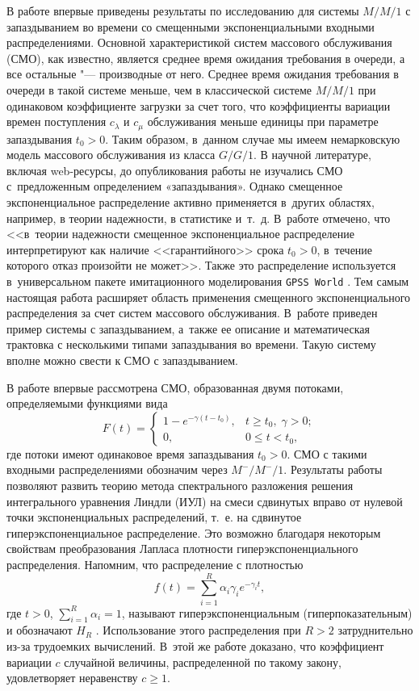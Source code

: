 В работе  \cite{tar:tarasov_1} впервые приведены результаты по исследованию для системы $M/M/1$ с запаздыванием во времени со смещенными экспоненциальными входными распределениями.
Основной характеристикой систем массового обслуживания (СМО), как известно, является среднее время ожидания требования в очереди, а все остальные "--- производные от него. Среднее время ожидания требования в очереди в такой системе меньше, чем в классической системе $M/M/1$ при одинаковом коэффициенте загрузки за счет того, что коэффициенты вариации времен поступления $c_{\lambda}$ и $c_{\mu}$ обслуживания меньше единицы при параметре запаздывания $t_0>0$. Таким образом, в~данном случае мы имеем немарковскую модель массового обслуживания из класса $G/G/1$. В научной литературе, включая web-ресурсы, до опубликования работы \cite{tar:tarasov_1} не изучались СМО с~предложенным определением «запаздывания». Однако смещенное экспоненциальное распределение активно применяется в~других областях, например, в теории надежности, в статистике и~т.~д. В~работе \cite{tar:kos} отмечено, что <<в~теории надежности смещенное экспоненциальное распределение интерпретируют как наличие <<гарантийного>> срока $t_0>0$, в~течение которого отказ произойти не может>>. Также это распределение используется в~универсальном пакете имитационного моделирования {\tt GPSS World} \cite{tar:boev}. 
Тем самым  настоящая работа расширяет область применения смещенного экспоненциального распределения за счет систем массового обслуживания. 
В~работе \cite{tar:med} приведен пример системы с запаздыванием, а~также ее описание и математическая трактовка с несколькими типами запаздывания во времени. Такую систему вполне можно свести к СМО с запаздыванием.

В работе \cite{tar:tarasov_1} впервые рассмотрена СМО, образованная двумя потоками, определяемыми функциями вида
$$
F(t)=\left\{\begin{array}{cl}
1-e^{-\gamma(t-t_0)}, & t\geq t_0 , \; \gamma>0;\\
0, & 0\leq t<t_0,
\end{array}\right.
$$ 
где потоки имеют одинаковое время запаздывания $t_0>0$. 
СМО с такими входными распределениями обозначим через $M^-/M^-/1$. 
Результаты работы \cite{tar:tarasov_1} позволяют развить теорию метода спектрального разложения решения интегрального уравнения Линдли (ИУЛ) на смеси сдвинутых вправо от нулевой точки экспоненциальных распределений, т.~е. на сдвинутое гиперэкспоненциальное распределение. Это возможно благодаря некоторым свойствам преобразования Лапласа плотности гиперэкспоненциального распределения. Напомним, что распределение с плотностью 
$$
f(t)=\sum\limits_{i=1}^R\alpha_i\gamma_ie^{-\gamma_it},
$$ 
где $t>0$, $\sum _{i=1}^R\alpha_i=1$, называют гиперэкспоненциальным (гиперпоказательным) и обозначают $H_R$ \cite{tar:klein}. Использование этого распределения при $R>2$ затруднительно из-за трудоемких вычислений. 
В~этой же работе доказано, что коэффициент вариации $c$ случайной величины, распределенной по такому закону, удовлетворяет неравенству $c\geq1$. 

